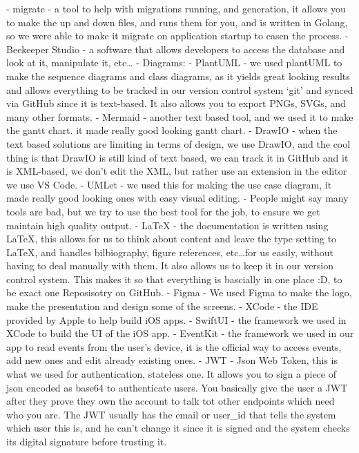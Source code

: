 - migrate - a tool to help with migrations running, and generation, it allows you to make the up and down files, and runs them for you, and is written in Golang, so we were able to make it migrate on application startup to easen the process.
- Beekeeper Studio - a software that allows developers to access the database and look at it, manipulate it, etc\dots
- Diagrams:
    - PlantUML - we used plantUML to make the sequence diagrams and class diagrams, as it yields great looking results and allows everything to be tracked in our version control system `git' and synced via GitHub since it is text-based. It also allows you to export PNGs, SVGs, and many other formats.
    - Mermaid - another text based tool, and we used it to make the gantt chart. it made really good looking gantt chart.
    - DrawIO - when the text based solutions are limiting in terms of design, we use DrawIO, and the cool thing is that DrawIO is still kind of text based, we can track it in GitHub and it is XML-based, we don't edit the XML, but rather use an extension in the editor we use VS Code.
    - UMLet - we used this for making the use case diagram, it made really good looking ones with easy visual editing.
    - People might say many tools are bad, but we try to use the best tool for the job, to ensure we get maintain high quality output.
- LaTeX - the documentation is written using LaTeX, this allows for us to think about content and leave the type setting to LaTeX, and handles bilbiography, figure references, etc\dots for us easily, without having to deal manually with them. It also allows us to keep it in our version control system. This makes it so that everything is bascially in one place :D, to be exact one Reposisotry on GitHub.
- Figma - We used Figma to make the logo, make the presentation and design some of the screens.
- XCode - the IDE provided by Apple to help build iOS apps.
- SwiftUI - the framework we used in XCode to build the UI of the iOS app.
- EventKit - the framework we used in our app to read events from the user's device, it is the official way to access events, add new ones and edit already existing ones.
- JWT - Json Web Token, this is what we used for authentication, stateless one. It allows you to sign a piece of json encoded as base64 to authenticate users. You basically give the user a JWT after they prove they own the account to talk tot other endpoints which need who you are. The JWT usually has the email or user\_id that tells the system which user this is, and he can't change it since it is signed and the system checks its digital signature before trusting it.
